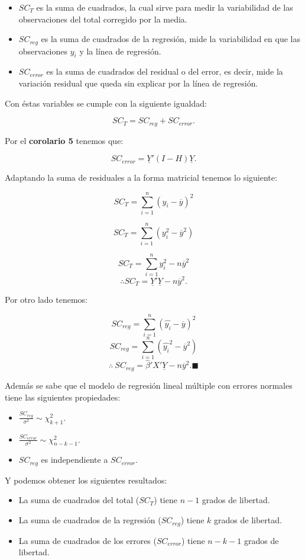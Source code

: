\documentclass[
  a4paper,
  oneside,
  openany]{book}
\begin{document}
\begin{itemize}
\item
  \(SC_{T}\) es la suma de cuadrados, la cual sirve para medir la variabilidad de las observaciones del total corregido por la media.
\item
  \(SC_{reg}\) es la suma de cuadrados de la regresión, mide la variabilidad en que las observaciones \(y_{i}\) y la línea de regresión.
\item
  \(SC_{error}\) es la suma de cuadrados del residual o del error, es decir, mide la variación residual que queda sin explicar por la línea de regresión.
\end{itemize}

Con éstas variables se cumple con la siguiente igualdad:

\[SC_{T}=SC_{reg}+SC_{error}.\]

Por el \textbf{corolario 5} tenemos que:

\[SC_{error}=\underline{Y}'(I-H)\underline{Y}.\]

Adaptando la suma de residuales a la forma matricial tenemos lo siguiente:

\[SC_{T}=\sum_{i=1}^{n}(y_{i}-\overline{y})^2\]

\[SC_{T}=\sum_{i=1}^{n}(y_{i}^2-\overline{y}^2)\]

\[SC_{T}=\sum_{i=1}^{n}y_{i}^2-n\overline{y}^2\]
\[\therefore SC_{T}=\underline{Y}'\underline{Y}-n\overline{y}^2.\]

Por otro lado tenemos:

\[SC_{reg}=\sum_{i=1}^{n}(\hat{y_{i}}-\overline{y})^2\]
\[SC_{reg}=\sum_{i=1}^{n}(\hat{y_{i}}^2-\overline{y}^2)\]
\[\therefore \  SC_{reg}=\hat{\beta}'X'\underline{Y}-n\overline{y}^2. \blacksquare \]

Además se sabe que el modelo de regresión lineal múltiple con errores normales tiene las siguientes propiedades:

\begin{itemize}
\item
  \(\frac{SC_{reg}}{\sigma^2} \sim \chi^2_{k+1}.\)
\item
  \(\frac{SC_{error}}{\sigma^2} \sim \chi^2_{n-k-1}.\)
\item
  \(SC_{reg}\) es independiente a \(SC_{error}.\)
\end{itemize}

Y podemos obtener los siguientes resultados:

\begin{itemize}
\item
  La suma de cuadrados del total (\(SC_{T}\)) tiene \(n-1\) grados de libertad.
\item
  La suma de cuadrados de la regresión (\(SC_{reg}\)) tiene \(k\) grados de libertad.
\item
  La suma de cuadrados de los errores (\(SC_{error}\)) tiene \(n-k-1\) grados de libertad.
\end{itemize}
\end{document}
